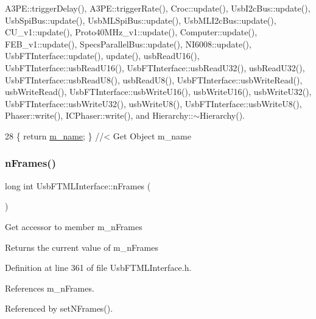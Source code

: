 A3\+P\+E\+::trigger\+Delay(), A3\+P\+E\+::trigger\+Rate(), Croc\+::update(), Usb\+I2c\+Bus\+::update(), Usb\+Spi\+Bus\+::update(), Usb\+M\+L\+Spi\+Bus\+::update(), Usb\+M\+L\+I2c\+Bus\+::update(), C\+U\+\_\+v1\+::update(), Proto40\+M\+Hz\+\_\+v1\+::update(), Computer\+::update(), F\+E\+B\+\_\+v1\+::update(), Specs\+Parallel\+Bus\+::update(), N\+I6008\+::update(), Usb\+F\+T\+Interface\+::update(), update(), usb\+Read\+U16(), Usb\+F\+T\+Interface\+::usb\+Read\+U16(), Usb\+F\+T\+Interface\+::usb\+Read\+U32(), usb\+Read\+U32(), Usb\+F\+T\+Interface\+::usb\+Read\+U8(), usb\+Read\+U8(), Usb\+F\+T\+Interface\+::usb\+Write\+Read(), usb\+Write\+Read(), Usb\+F\+T\+Interface\+::usb\+Write\+U16(), usb\+Write\+U16(), usb\+Write\+U32(), Usb\+F\+T\+Interface\+::usb\+Write\+U32(), usb\+Write\+U8(), Usb\+F\+T\+Interface\+::usb\+Write\+U8(), Phaser\+::write(), I\+C\+Phaser\+::write(), and Hierarchy\+::$\sim$\+Hierarchy().


\begin{DoxyCode}
28 \{ \textcolor{keywordflow}{return} \hyperlink{classObject_a8b83c95c705d2c3ba0d081fe1710f48d}{m\_name}; \} \textcolor{comment}{//< Get Object m\_name}
\end{DoxyCode}
\mbox{\label{classUsbFTMLInterface_a55531536a54b736b9c9c38bb792ec4c9}} 
\subsubsection{\texorpdfstring{n\+Frames()}{nFrames()}}
{\footnotesize\ttfamily long int Usb\+F\+T\+M\+L\+Interface\+::n\+Frames (\begin{DoxyParamCaption}{ }\end{DoxyParamCaption})\hspace{0.3cm}{\ttfamily [inline]}}

Get accessor to member m\+\_\+n\+Frames \begin{DoxyReturn}{Returns}
the current value of m\+\_\+n\+Frames 
\end{DoxyReturn}


Definition at line 361 of file Usb\+F\+T\+M\+L\+Interface.\+h.



References m\+\_\+n\+Frames.



Referenced by set\+N\+Frames().


